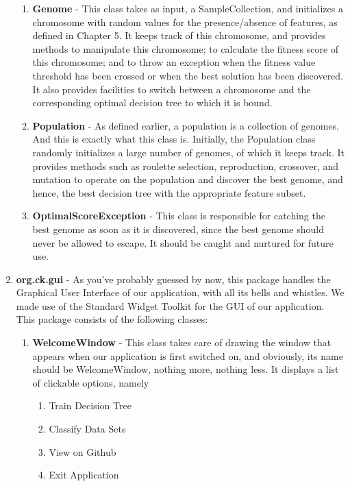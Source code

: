 \documentclass[conference]{IEEEtran}
\begin{document}
\begin{enumerate}
\begin{enumerate}
\item{\textbf{Genome}} - This class takes as input, a SampleCollection, and initializes a chromosome with random values for the presence/absence of features, as defined in Chapter 5. It keeps track of this chromosome, and provides methods to manipulate this chromosome; to calculate the fitness score of this chromosome; and to throw an exception when the fitness value threshold has been crossed or when the best solution has been discovered. It also provides facilities to switch between a chromosome and the corresponding optimal decision tree to which it is bound.


\item{\textbf{Population}} - As defined earlier, a population is a collection of genomes. And this is exactly what this class is. Initially, the Population class randomly initializes a large number of genomes, of which it keeps track. It provides methods such as roulette selection, reproduction, crossover, and mutation to operate on the population and discover the best genome, and hence, the best decision tree with the appropriate feature subset.

\item{\textbf{OptimalScoreException}} - This class is responsible for catching the best genome as soon as it is discovered, since the best genome should never be allowed to escape. It should be caught and nurtured for future use.

\end{enumerate}


\item{\textbf{org.ck.gui}} - As you've probably guessed by now, this package handles the Graphical User Interface of our application, with all its bells and whistles. We made use of the Standard Widget Toolkit for the GUI of our application. This package consists of the following classes:

\begin{enumerate}

\item{\textbf{WelcomeWindow}} - This class takes care of drawing the window that appears when our application is first switched on, and obviously, its name should be WelcomeWindow, nothing more, nothing less. It displays a list of clickable options, namely
\begin{enumerate}
\item{Train Decision Tree}
\item{Classify Data Sets}
\item{View on Github}
\item{Exit Application}
\end{enumerate}


\end{enumerate}
\end{enumerate}
\end{document}
